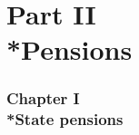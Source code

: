 \documentclass[12pt,a4paper]{article}
\begin{document}
%
%
%
%
%
%
%
%
%
%
%


\part[Part II --- Pensions]{Part II\\*Pensions}

\section[Chapter I --- State pensions]{Chapter I\\*State pensions}
\end{document}
